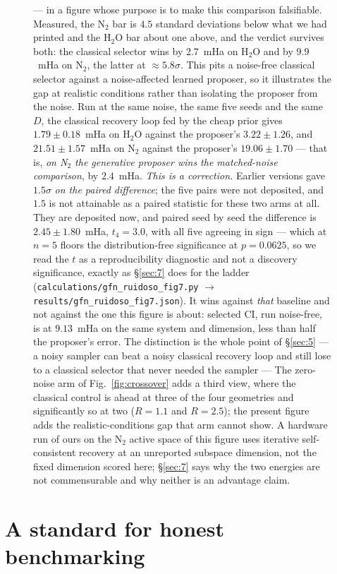 \documentclass[onecolumn,a4paper]{quantumarticle}
\begin{document}
\begin{figure}[tbp]
{--- in a figure whose purpose is to make this comparison falsifiable. Measured, the N$_2$ bar is $4.5$ standard
deviations below what we had printed and the H$_2$O bar about one above, and the verdict survives both: the classical
selector wins by $2.7$~mHa on H$_2$O and by $9.9$~mHa on N$_2$, the latter at ${\approx}5.8\sigma$. This pits a
noise-free classical selector against a noise-affected learned proposer, so it illustrates the gap at realistic
conditions rather than isolating the proposer from the noise. Run at the same noise, the same five seeds and
the same $D$, the classical recovery loop fed by the cheap prior gives $1.79\pm0.18$~mHa on H$_2$O against the
proposer's $3.22\pm1.26$, and $21.51\pm1.57$~mHa on N$_2$ against the proposer's $19.06\pm1.70$ --- that is, \emph{on
N$_2$ the generative proposer wins the matched-noise comparison}, by $2.4$~mHa. \emph{This is a correction.} Earlier versions gave $1.5\sigma$ \emph{on the paired difference}; the five pairs were not deposited, and $1.5$ is not attainable as a paired statistic for these two arms at all. They are deposited now, and paired seed by seed the difference is $2.45\pm1.80$~mHa, $t_{4}{=}3.0$, with all five agreeing in sign --- which at $n{=}5$ floors the distribution-free significance at $p{=}0.0625$, so we read the $t$ as a reproducibility diagnostic and not a discovery significance, exactly as \S\ref{sec:7} does for the ladder (\texttt{calculations/gfn\_ruidoso\_fig7.py} $\to$ \texttt{results/gfn\_ruidoso\_fig7.json}). It wins against \emph{that}
baseline and not against the one this figure is about: selected CI, run noise-free, is at $9.13$~mHa on the same
system and dimension, less than half the proposer's error. The distinction is the whole point of \S\ref{sec:5}
--- a noisy sampler can beat a noisy classical recovery loop and still lose to a classical selector that never
needed the sampler --- The
zero-noise arm of Fig.~\ref{fig:crossover} adds a third view, where the classical control is ahead at three of
the four geometries and significantly so at two ($R{=}1.1$ and $R{=}2.5$); the present figure adds the realistic-conditions
gap that arm cannot show. A hardware run of ours on the N$_2$ active space of this figure \cite{bonilla2026spectral}
uses iterative self-consistent recovery at an unreported subspace dimension, not the fixed dimension scored here;
\S\ref{sec:7} says why the two energies are not commensurable and why neither is an advantage claim.}
\label{fig:hci}
\end{figure}


\section{A standard for honest benchmarking}\label{sec:6}
\end{document}
